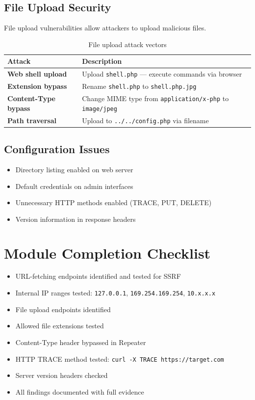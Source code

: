 \subsection{File Upload Security}
File upload vulnerabilities allow attackers to upload malicious files.

\begin{table}[H]
\centering
\caption{File upload attack vectors}
\begin{tabularx}{\textwidth}{>{\bfseries}lX}
\toprule
Attack & Description \\
\midrule
Web shell upload & Upload \texttt{shell.php} — execute commands via browser \\
Extension bypass & Rename \texttt{shell.php} to \texttt{shell.php.jpg} \\
Content-Type bypass & Change MIME type from \texttt{application/x-php} to \texttt{image/jpeg} \\
Path traversal & Upload to \texttt{../../config.php} via filename \\
\bottomrule
\end{tabularx}
\end{table}

\subsection{Configuration Issues}
\begin{itemize}
  \item Directory listing enabled on web server
  \item Default credentials on admin interfaces
  \item Unnecessary HTTP methods enabled (TRACE, PUT, DELETE)
  \item Version information in response headers
\end{itemize}

\section{Module Completion Checklist}

\begin{tcolorbox}[findingstyle, title={Level 08 Burp Checklist}]
\begin{itemize}
  \item[\checkbox] URL-fetching endpoints identified and tested for SSRF
  \item[\checkbox] Internal IP ranges tested: \texttt{127.0.0.1}, \texttt{169.254.169.254}, \texttt{10.x.x.x}
  \item[\checkbox] File upload endpoints identified
  \item[\checkbox] Allowed file extensions tested
  \item[\checkbox] Content-Type header bypassed in Repeater
  \item[\checkbox] HTTP TRACE method tested: \texttt{curl -X TRACE https://target.com}
  \item[\checkbox] Server version headers checked
  \item[\checkbox] All findings documented with full evidence
\end{itemize}
\end{tcolorbox}
